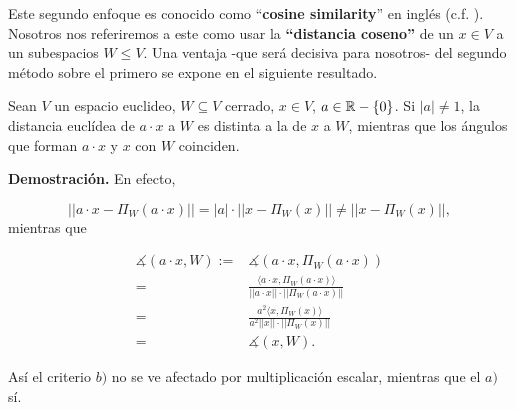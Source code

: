 Este segundo
enfoque es conocido como ``\textbf{cosine similarity}'' en
inglés (c.f. \cite{cosineSim}). Nosotros nos referiremos a 
este como usar la \textbf{``distancia coseno''} de un $x \in V$
a un subespacios $W \leq V$.
Una ventaja -que será decisiva
para nosotros- del segundo método sobre el primero se
expone en el siguiente resultado.


\begin{prop}
\label{prop: angulo se conserva bajo mult. esc.}
Sean $V$ un espacio euclideo, $W \subseteq V$ cerrado, $x \in V$,
$a \in \mathbb{R} - \{ 0 \}$. Si $|a| \neq 1$, la distancia euclídea 
de $a \cdot x$ a $W$ es distinta
a la de $x$ a $W$, mientras que los 
ángulos que forman $a \cdot x$ y $x$
con $W$ coinciden.
\end{prop}
\noindent
\textbf{Demostración.}
En efecto, 

\[
|| a \cdot x - \Pi_{W}(a \cdot x) || = |a| \cdot || x - \Pi_{W}(x) ||
\neq || x - \Pi_{W}(x) ||, 
\]
mientras que

\begin{align*}
\measuredangle (a \cdot x, W):=& \measuredangle(a \cdot x, \Pi_{W}(a \cdot x)) \\
= & \frac{\langle a \cdot x , \Pi_{W}(a \cdot x) \rangle}{|| a \cdot x || \cdot 
|| \Pi_{W}(a \cdot x)  ||} \\
= & \frac{a^{2}  \langle   x , \Pi_{W}(x) \rangle}{a^{2} ||  x || \cdot 
|| \Pi_{W}( x)  ||}  \\
= & \measuredangle (x, W).
\end{align*}


\QEDB
\vspace{0.2cm}

Así el criterio $b)$ no se ve afectado por multiplicación escalar,
mientras que el $a)$ sí.


\QEDB
\vspace{0.2cm}

